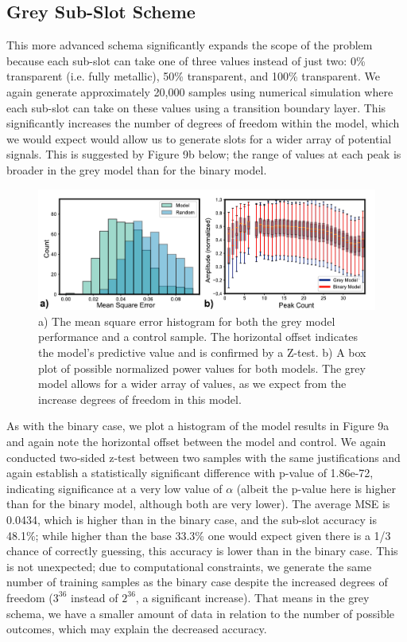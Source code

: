\documentclass[11pt]{article}
\begin{document}
\subsection*{Grey Sub-Slot Scheme}

\noindent This more advanced schema significantly expands the scope of the problem because each sub-slot can take one of three values instead of just two: 0\% transparent (i.e. fully metallic), 50\% transparent, and 100\% transparent. We again generate approximately 20,000 samples using numerical simulation where each sub-slot can take on these values using a transition boundary layer. This significantly increases the number of degrees of freedom within the model, which we would expect would allow us to generate slots for a wider array of potential signals.  This is suggested by Figure 9b below; the range of values at each peak is broader in the grey model than for the binary model.
%
\begin{figure}[H]
	\includegraphics[width=6.5in]{figures/histandboxgreyoverlay}
		\caption{a) The mean square error histogram for both the grey model performance and a control sample. The horizontal offset indicates the model's predictive value and is confirmed by a Z-test. b) A box plot of possible normalized power values for both models. The grey model allows for a wider array of values, as we expect from the increase degrees of freedom in this model.}
\end{figure}

\noindent As with the binary case, we plot a histogram of the model results in Figure 9a and again note the horizontal offset between the model and control. We again conducted two-sided z-test between two samples with the same justifications and again establish a statistically significant difference with p-value of 1.86e-72, indicating significance at a very low value of $\alpha$ (albeit the p-value here is higher than for the binary model, although both are very lower). The average MSE is 0.0434, which is higher than in the binary case, and the sub-slot accuracy is 48.1\%; while higher than the base 33.3\% one would expect given there is a 1/3 chance of correctly guessing, this accuracy is lower than in the binary case. This is not unexpected; due to computational constraints, we generate the same number of training samples as the binary case despite the increased degrees of freedom ($3^{36}$ instead of $2^{36}$, a significant increase). That means in the grey schema, we have a smaller amount of data in relation to the number of possible outcomes, which may explain the decreased accuracy.
\end{document}
